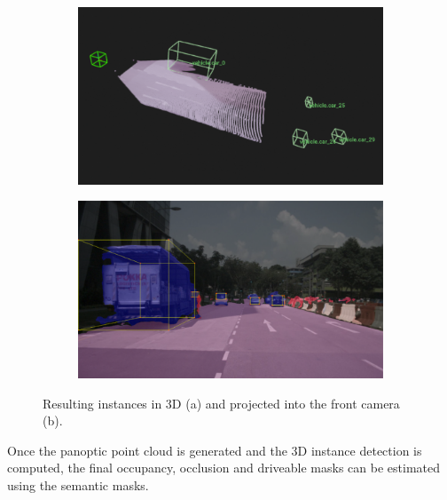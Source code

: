 \begin{figure}[!ht]
    \centering
    \begin{subfigure}[b]{0.45\textwidth}
        \includegraphics[width=\textwidth]{images/methodology/3d_cuboids_1.png}
        \caption{}
        \label{fig:instance_scene_images_a}
    \end{subfigure}
    \hfill
    \begin{subfigure}[b]{0.45\textwidth}
        \includegraphics[width=\textwidth]{images/methodology/raw_cuboid_1.png}
        \caption{}
        \label{fig:instance_scene_images_b}
    \end{subfigure}

    \caption{Resulting instances in 3D (a) and projected into the front camera (b).}
    \label{fig:instance_scene_images}
\end{figure}


 \label{sec:instance_bev_mask_methodology}
Once the panoptic point cloud is generated and the 3D instance detection is computed, the final occupancy, occlusion and driveable masks can be estimated using the  semantic masks.

